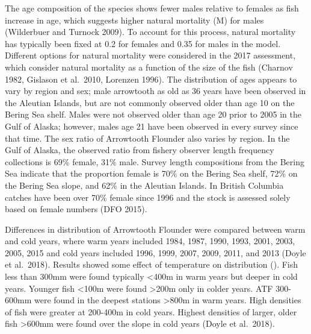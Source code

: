 \documentclass[11pt,
  english,
  a4paper,
]{article}
\begin{document}
\leavevmode\tagmcend\tagstructend\par


The age composition of the species shows fewer males relative to females as fish increase in age, which suggests higher natural mortality (M) for males (Wilderbuer and Turnock 2009). To account for this process, natural mortality has typically been fixed at 0.2 for females and 0.35 for males in the model. Different options for natural mortality were considered in the 2017 assessment, which consider natural mortality as a function of the size of the fish (Charnov 1982, Gislason et al.~2010, Lorenzen 1996). The distribution of ages appears to vary by region and sex; male arrowtooth as old as 36 years have been observed in the Aleutian Islands, but are not commonly observed older than age 10 on the Bering Sea shelf. Males were not observed older than age 20 prior to 2005 in the Gulf of Alaska; however, males age 21 have been observed in every survey since that time. The sex ratio of Arrowtooth Flounder also varies by region. In the Gulf of Alaska, the observed ratio from fishery observer length frequency collections is 69\% female, 31\% male. Survey length compositions from the Bering Sea indicate that the proportion female is 70\% on the Bering Sea shelf, 72\% on the Bering Sea slope, and 62\% in the Aleutian Islands. In British Columbia catches have been over 70\% female since 1996 and the stock is assessed solely based on female numbers (DFO 2015).

\leavevmode\tagmcend\tagstructend\par


Differences in distribution of Arrowtooth Flounder were compared between warm and cold years, where warm years included 1984, 1987, 1990, 1993, 2001, 2003, 2005, 2015 and cold years included 1996, 1999, 2007, 2009, 2011, and 2013 (Doyle et al.~2018). Results showed some effect of temperature on distribution (). Fish less than 300mm were found typically \textless400m in warm years but deeper in cold years. Younger fish \textless100m were found \textgreater200m only in colder years. ATF 300-600mm were found in the deepest stations \textgreater800m in warm years. High densities of fish were greater at 200-400m in cold years. Highest densities of larger, older fish \textgreater600mm were found over the slope in cold years (Doyle et al.~2018).
\end{document}
